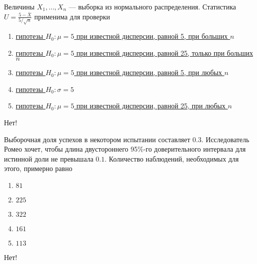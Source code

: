 \documentclass[t]{beamer}
\begin{document}
 \begin{frame} \label{17-No} 
\begin{block}{17} 

  Величины $X_1,\ldots,X_n$ — выборка из нормального распределения.  Статистика $U=\frac{5-\bar{X}}{5/\sqrt{n}}$ применима для проверки
  


 \end{block} 
\begin{enumerate} 
\item[] \hyperlink{17-No}{\beamergotobutton{} гипотезы $H_0: \mu = 5$ при известной дисперсии, равной 5, при больших $n$}
\item[] \hyperlink{17-No}{\beamergotobutton{} гипотезы $H_0: \mu = 5$ при известной дисперсии, равной 25, только при больших $n$}
\item[] \hyperlink{17-No}{\beamergotobutton{} гипотезы $H_0: \mu = 5$ при известной дисперсии, равной 5, при любых $n$}
\item[] \hyperlink{17-No}{\beamergotobutton{} гипотезы $H_0: \sigma = 5$}
\item[] \hyperlink{17-Yes}{\beamergotobutton{} гипотезы $H_0: \mu = 5$ при известной дисперсии, равной 25, при любых $n$}
\end{enumerate} 

 \alert{Нет!} 
\end{frame} 


 \begin{frame} \label{18-No} 
\begin{block}{18} 

Выборочная доля успехов в некотором испытании составляет $0.3$. Исследователь Ромео хочет, чтобы длина двустороннего 95\%-го доверительного интервала для истинной доли не превышала $0.1$. Количество наблюдений, необходимых для этого, примерно равно
  


 \end{block} 
\begin{enumerate} 
\item[] \hyperlink{18-No}{\beamergotobutton{} $81$}
\item[] \hyperlink{18-No}{\beamergotobutton{} $225$}
\item[] \hyperlink{18-Yes}{\beamergotobutton{} $322$}
\item[] \hyperlink{18-No}{\beamergotobutton{} $161$}
\item[] \hyperlink{18-No}{\beamergotobutton{} $113$}
\end{enumerate} 

 \alert{Нет!} 
\end{frame} 
\end{document}
